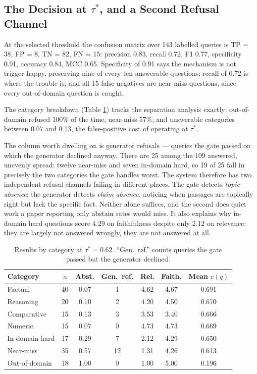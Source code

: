 \documentclass[conference]{IEEEtran}
\begin{document}
\subsection{The Decision at $\tau^\ast$, and a Second Refusal Channel}
\label{sec:categories}

At the selected threshold the confusion matrix over 143 labelled queries is TP = 38, FP = 8, TN = 82, FN = 15: precision 0.83, recall 0.72, F1 0.77, specificity 0.91, accuracy 0.84, MCC 0.65. Specificity of 0.91 says the mechanism is not trigger-happy, preserving nine of every ten answerable questions; recall of 0.72 is where the trouble is, and all 15 false negatives are near-miss questions, since every out-of-domain question is caught.

The category breakdown (Table \ref{tab:category}) tracks the separation analysis exactly: out-of-domain refused 100\% of the time, near-miss 57\%, and answerable categories between 0.07 and 0.13, the false-positive cost of operating at $\tau^\ast$.

The column worth dwelling on is generator refusals --- queries the gate passed on which the generator declined anyway. There are 25 among the 109 answered, unevenly spread: twelve near-miss and seven in-domain hard, so 19 of 25 fall in precisely the two categories the gate handles worst. The system therefore has two independent refusal channels failing in different places. The gate detects \emph{topic absence}; the generator detects \emph{claim absence}, noticing when passages are topically right but lack the specific fact. Neither alone suffices, and the second does quiet work a paper reporting only abstain rates would miss. It also explains why in-domain hard questions score 4.29 on faithfulness despite only 2.12 on relevance: they are largely not answered wrongly, they are not answered at all.

\begin{table}[htbp]
\centering
\caption{Results by category at $\tau^\ast = 0.62$. ``Gen.\ ref.'' counts queries the gate passed but the generator declined.}
\label{tab:category}
\begin{tabular}{@{}lcccccc@{}}
\toprule
Category & $n$ & Abst. & Gen.\ ref. & Rel. & Faith. & Mean $c(q)$ \\
\midrule
Factual & 40 & 0.07 & 1 & 4.62 & 4.67 & 0.691 \\
Reasoning & 20 & 0.10 & 2 & 4.20 & 4.50 & 0.670 \\
Comparative & 15 & 0.13 & 3 & 3.53 & 3.40 & 0.666 \\
Numeric & 15 & 0.07 & 0 & 4.73 & 4.73 & 0.669 \\
In-domain hard & 17 & 0.29 & 7 & 2.12 & 4.29 & 0.650 \\
Near-miss & 35 & 0.57 & 12 & 1.31 & 4.26 & 0.613 \\
Out-of-domain & 18 & 1.00 & 0 & 1.00 & 5.00 & 0.196 \\
\bottomrule
\end{tabular}
\end{table}
\end{document}
